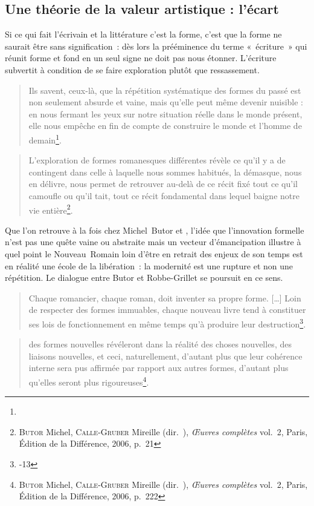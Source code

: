 \documentclass[12pt, a4paper]{article}
\begin{document}
\subsection{Une théorie de la valeur artistique : l'écart}
\label{theorie}
Si ce qui fait l'écrivain et la littérature c'est la forme, c'est que la forme ne saurait être sans signification~: dès lors la prééminence du terme «~écriture~» qui réunit forme et fond en un seul signe ne doit pas nous étonner. L'écriture subvertit à condition de se faire exploration plutôt que ressassement. 
\begin{quote}
    Ils savent, ceux-là, que la répétition systématique des formes du passé est non seulement absurde et vaine, mais qu’elle peut même devenir nuisible : en nous fermant les yeux sur notre situation réelle dans le monde présent, elle nous empêche en fin de compte de construire le monde et l’homme de demain\footnote{}.
\end{quote}
\begin{quote}
	L’exploration de formes romanesques différentes révèle ce qu’il y a de contingent dans celle à laquelle nous sommes habitués, la démasque, nous en délivre, nous permet de retrouver au-delà de ce récit fixé tout ce qu’il camoufle ou qu’il tait, tout ce récit fondamental dans lequel baigne notre vie entière\footnote{\textsc{Butor} Michel, \textsc{Calle-Gruber} Mireille (dir.~), \textit{Œuvres complètes} vol.~2, Paris, Édition de la Différence, 2006, p.~21}.
\end{quote}
Que l'on retrouve à la fois chez Michel~Butor et \robbe, l'idée que l'innovation formelle n'est pas une quête vaine ou abstraite mais un vecteur d'émancipation illustre à quel point le Nouveau~Romain loin d'être en retrait des enjeux de son temps est en réalité une école de la libération~: la modernité est une rupture et non une répétition. Le dialogue entre Butor et Robbe-Grillet se poursuit en ce sens.
\begin{quote}
    Chaque romancier, chaque roman, doit inventer sa propre forme. […] Loin de respecter des formes immuables, chaque nouveau livre tend à constituer ses lois de fonctionnement en même temps qu'à produire leur destruction\footnote{-13}.
\end{quote}
\begin{quote}
    des formes nouvelles révéleront dans la réalité des choses nouvelles, des liaisons nouvelles, et ceci, naturellement, d’autant plus que leur cohérence interne sera pus affirmée par rapport aux autres formes, d’autant plus qu’elles seront plus rigoureuses\footnote{\textsc{Butor} Michel, \textsc{Calle-Gruber} Mireille (dir.~), \textit{Œuvres complètes} vol.~2, Paris, Édition de la Différence, 2006, p.~222}.         
\end{quote}
\end{document}
